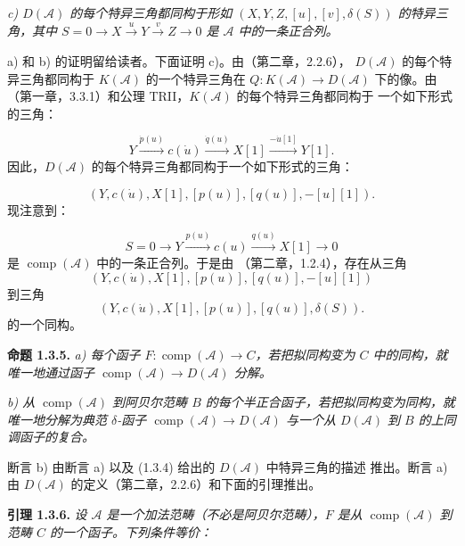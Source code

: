\clearpage
{}%
\begingroup\small\setlength{\parskip}{0pt}\setlength{\emergencystretch}{1.5em}
\setlength{\abovedisplayskip}{4pt plus 2pt minus 2pt}%
\setlength{\belowdisplayskip}{4pt plus 2pt minus 2pt}%

\noindent\textit{c) $D(\mathcal A)$ 的每个特异三角都同构于形如
$(X,Y,Z,[u],[v],\delta(S))$ 的特异三角，其中
$S=0\longrightarrow X\xrightarrow{u}Y\xrightarrow{v}Z\longrightarrow0$
是 $\mathcal A$ 中的一条正合列。}

a) 和 b) 的证明留给读者。下面证明 c)。由（第二章，2.2.6），
$D(\mathcal A)$ 的每个特异三角都同构于 $K(\mathcal A)$ 的一个特异三角在
$Q\colon K(\mathcal A)\longrightarrow D(\mathcal A)$ 下的像。由
（第一章，3.3.1）和公理 TRII，$K(\mathcal A)$ 的每个特异三角都同构于
一个如下形式的三角：

\[
Y\xrightarrow{\dot{p}(u)}c(\dot u)
\xrightarrow{\dot{q}(u)}X[1]
\xrightarrow{-\dot u[1]}Y[1].
\]
因此，$D(\mathcal A)$ 的每个特异三角都同构于一个如下形式的三角：

\[
(Y,c(\dot u),X[1],[p(u)],[q(u)],-[u][1]).
\]
现注意到：

\[
S=0\longrightarrow Y\xrightarrow{p(u)}c(u)
\xrightarrow{q(u)}X[1]\longrightarrow0
\]
是 $\operatorname{comp}(\mathcal A)$ 中的一条正合列。于是由
（第二章，1.2.4），存在从三角
\[
(Y,c(\dot u),X[1],[p(u)],[q(u)],-[u][1])
\]
到三角
\[
(Y,c(\dot u),X[1],[p(u)],[q(u)],\delta(S)).
\]
的一个同构。

\medskip\noindent\textbf{命题 1.3.5.}\quad
\textit{a) 每个函子
$F\colon\operatorname{comp}(\mathcal A)\longrightarrow C$，若把拟同构变为
$C$ 中的同构，就唯一地通过函子
$\operatorname{comp}(\mathcal A)\longrightarrow D(\mathcal A)$ 分解。}

\noindent\textit{b) 从 $\operatorname{comp}(\mathcal A)$ 到阿贝尔范畴
$B$ 的每个半正合函子，若把拟同构变为同构，就唯一地分解为典范
$\delta$-函子
$\operatorname{comp}(\mathcal A)\longrightarrow D(\mathcal A)$ 与一个从
$D(\mathcal A)$ 到 $B$ 的上同调函子的复合。}

断言 b) 由断言 a) 以及 (1.3.4) 给出的 $D(\mathcal A)$ 中特异三角的描述
推出。断言 a) 由 $D(\mathcal A)$ 的定义（第二章，2.2.6）和下面的引理推出。

\medskip\noindent\textbf{引理 1.3.6.}\quad
\textit{设 $\mathcal A$ 是一个加法范畴（不必是阿贝尔范畴），$F$ 是从
$\operatorname{comp}(\mathcal A)$ 到范畴 $C$ 的一个函子。下列条件等价：}
\endgroup
